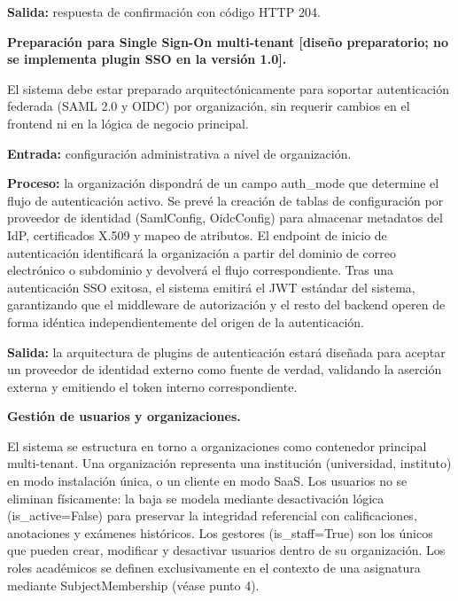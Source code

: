 \begin{functional}
\begin{functional}
    \textbf{Salida:} respuesta de confirmación con código HTTP 204.

    \item \textbf{Preparación para Single Sign-On multi-tenant [diseño preparatorio; no se implementa plugin SSO en la versión 1.0].}

    El sistema debe estar preparado arquitectónicamente para soportar autenticación federada (SAML 2.0 y OIDC) por organización, sin requerir cambios en el frontend ni en la lógica de negocio principal.

    \textbf{Entrada:} configuración administrativa a nivel de organización.

    \textbf{Proceso:} la organización dispondrá de un campo auth\_mode que determine el flujo de autenticación activo. Se prevé la creación de tablas de configuración por proveedor de identidad (SamlConfig, OidcConfig) para almacenar metadatos del IdP, certificados X.509 y mapeo de atributos. El endpoint de inicio de autenticación identificará la organización a partir del dominio de correo electrónico o subdominio y devolverá el flujo correspondiente. Tras una autenticación SSO exitosa, el sistema emitirá el JWT estándar del sistema, garantizando que el middleware de autorización y el resto del backend operen de forma idéntica independientemente del origen de la autenticación.

    \textbf{Salida:} la arquitectura de plugins de autenticación estará diseñada para aceptar un proveedor de identidad externo como fuente de verdad, validando la aserción externa y emitiendo el token interno correspondiente.

  \end{functional}

  \item \textbf{Gestión de usuarios y organizaciones.}

  El sistema se estructura en torno a organizaciones como contenedor principal multi-tenant. Una organización representa una institución (universidad, instituto) en modo instalación única, o un cliente en modo SaaS. Los usuarios no se eliminan físicamente: la baja se modela mediante desactivación lógica (is\_active=False) para preservar la integridad referencial con calificaciones, anotaciones y exámenes históricos. Los gestores (is\_staff=True) son los únicos que pueden crear, modificar y desactivar usuarios dentro de su organización. Los roles académicos se definen exclusivamente en el contexto de una asignatura mediante SubjectMembership (véase punto 4).


\end{functional}
